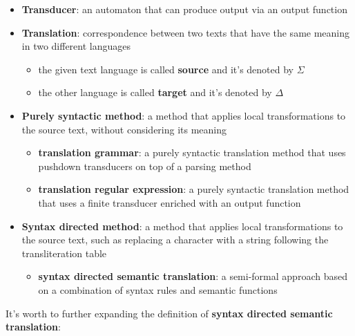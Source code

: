 \documentclass[english]{article}
\begin{document}
\begin{itemize}
  \item \textbf{Transducer}: an automaton that can produce output via an output function
  \item \textbf{Translation}: correspondence between two texts that have the same meaning in two different languages
        \begin{itemize}
          \item the given text language is called \textbf{source} and it's denoted by \(\Sigma\)
          \item the other language is called \textbf{target} and it's denoted by \(\Delta\)
        \end{itemize}
  \item \textbf{Purely syntactic method}: a method that applies local transformations to the source text, without considering its meaning
        \begin{itemize}
          \item \textbf{translation grammar}: a purely syntactic translation method that uses pushdown transducers on top of a parsing method
          \item \textbf{translation regular expression}: a purely syntactic translation method that uses a finite transducer enriched with an output function
        \end{itemize}
  \item \textbf{Syntax directed method}: a method that applies local transformations to the source text, such as replacing a character with a string following the transliteration table
        \begin{itemize}
          \item \textbf{syntax directed semantic translation}: a semi-formal approach based on a combination of syntax rules and semantic functions
        \end{itemize}
\end{itemize}

It's worth to further expanding the definition of \textbf{syntax directed semantic translation}:
\end{document}
